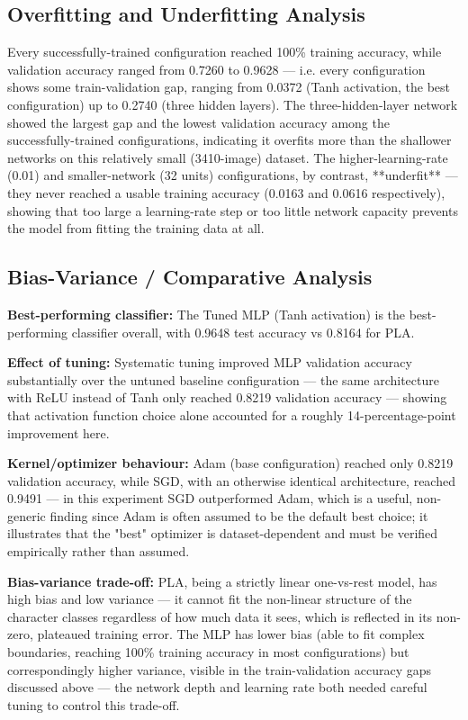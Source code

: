 \documentclass[12pt,a4paper]{article}
\begin{document}
\subsection{Overfitting and Underfitting Analysis}
Every successfully-trained configuration reached 100\% training accuracy, while validation
accuracy ranged from 0.7260 to 0.9628 — i.e. every configuration shows some train-validation
gap, ranging from 0.0372 (Tanh activation, the best configuration) up to 0.2740 (three hidden
layers). The three-hidden-layer network showed the largest gap and the lowest validation
accuracy among the successfully-trained configurations, indicating it overfits more than the
shallower networks on this relatively small (3410-image) dataset. The higher-learning-rate
(0.01) and smaller-network (32 units) configurations, by contrast, **underfit** — they never
reached a usable training accuracy (0.0163 and 0.0616 respectively), showing that too large a
learning-rate step or too little network capacity prevents the model from fitting the training
data at all.

\subsection{Bias-Variance / Comparative Analysis}
\textbf{Best-performing classifier:} The Tuned MLP (Tanh activation) is the best-performing
classifier overall, with 0.9648 test accuracy vs 0.8164 for PLA.

\textbf{Effect of tuning:} Systematic tuning improved MLP validation accuracy substantially over
the untuned baseline configuration — the same architecture with ReLU instead of Tanh only
reached 0.8219 validation accuracy — showing that activation function choice alone accounted for
a roughly 14-percentage-point improvement here.

\textbf{Kernel/optimizer behaviour:} Adam (base configuration) reached only 0.8219 validation
accuracy, while SGD, with an otherwise identical architecture, reached 0.9491 — in this
experiment SGD outperformed Adam, which is a useful, non-generic finding since Adam is often
assumed to be the default best choice; it illustrates that the "best" optimizer is
dataset-dependent and must be verified empirically rather than assumed.

\textbf{Bias-variance trade-off:} PLA, being a strictly linear one-vs-rest model, has high bias
and low variance — it cannot fit the non-linear structure of the character classes regardless of
how much data it sees, which is reflected in its non-zero, plateaued training error. The MLP has
lower bias (able to fit complex boundaries, reaching 100\% training accuracy in most
configurations) but correspondingly higher variance, visible in the train-validation accuracy
gaps discussed above — the network depth and learning rate both needed careful tuning to control
this trade-off.
\end{document}
